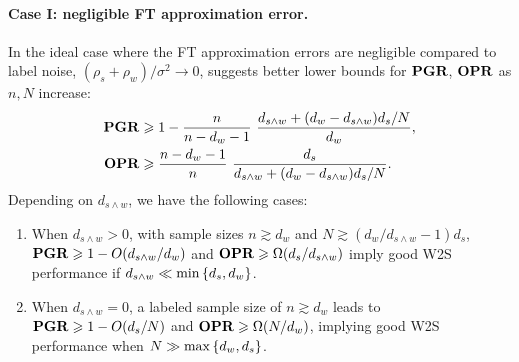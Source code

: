 \paragraph{Case I: negligible FT approximation error.}
In the ideal case where the FT approximation errors are negligible compared to label noise, $(\rho_s+\rho_w)/\sigma^2 \to 0$,  suggests better lower bounds for $\mathbf{PGR}$, $\mathbf{OPR}$ as $n,N$ increase:
\begin{align*}
    \mathbf{PGR} &\geqslant 1 - \frac{n}{n - d_w - 1}\ {\frac{d_{s \wedge w} + (d_w - d_{s \wedge w}) d_s / N}{d_w}}, \\
    \mathbf{OPR} &\geqslant \frac{n - d_w - 1}{n}\ \frac{d_s}{d_{s \wedge w} + (d_w - d_{s \wedge w}) {d_s}/{N}}.
\end{align*}
Depending on $d_{s \wedge w}$, we have the following cases:
\begin{enumerate}[label=(\alph*)]
    \item When $d_{s \wedge w} > 0$, with sample sizes $n \gtrsim d_w$ and $N \gtrsim (d_w / d_{s \wedge w} - 1) d_s$, $\mathbf{PGR} \geqslant 1 - O(d_{s \wedge w}/d_w)$ and $\mathbf{OPR} \geqslant \Omega(d_s / d_{s \wedge w})$ imply good W2S performance if $d_{s \wedge w} \ll \min\left\{d_s, d_w\right\}$.
    \item When $d_{s \wedge w} = 0$, a labeled sample size of $n \gtrsim d_w$ leads to $\mathbf{PGR} \geqslant 1 - O(d_s/N)$ and $\mathbf{OPR} \geqslant \Omega(N/d_w)$, implying good W2S performance when $N \gg \max\left\{d_w, d_s\right\}$.
\end{enumerate}


